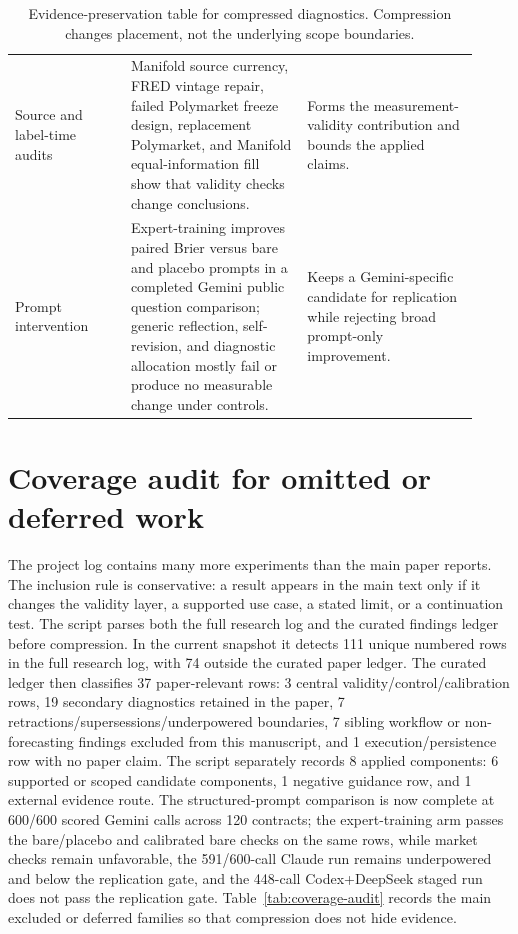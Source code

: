 \documentclass[11pt]{article}
\begin{document}
\begin{table}[htbp]
\begin{tabular}{L{0.23\linewidth} L{0.35\linewidth} L{0.34\linewidth}}
Source and label-time audits & Manifold source currency, FRED vintage repair, failed Polymarket freeze design, replacement Polymarket, and Manifold equal-information fill show that validity checks change conclusions. & Forms the measurement-validity contribution and bounds the applied claims. \\
Prompt intervention & Expert-training improves paired Brier versus bare and placebo prompts in a completed Gemini public question comparison; generic reflection, self-revision, and diagnostic allocation mostly fail or produce no measurable change under controls. & Keeps a Gemini-specific candidate for replication while rejecting broad prompt-only improvement. \\
\bottomrule
\end{tabular}
\caption{Evidence-preservation table for compressed diagnostics. Compression changes placement, not the underlying scope boundaries.}
\label{tab:evidence-ledger}
\end{table}

\section{Coverage audit for omitted or deferred work}
\label{app:coverage-audit}

The project log contains many more experiments than the main paper reports. The inclusion rule is conservative: a result appears in the main text only if it changes the validity layer, a supported use case, a stated limit, or a continuation test. The  script parses both the full research log and the curated findings ledger before compression. In the current snapshot it detects 111 unique numbered rows in the full research log, with 74 outside the curated paper ledger. The curated ledger then classifies 37 paper-relevant rows: 3 central validity/control/calibration rows, 19 secondary diagnostics retained in the paper, 7 retractions/supersessions/underpowered boundaries, 7 sibling workflow or non-forecasting findings excluded from this manuscript, and 1 execution/persistence row with no paper claim. The  script separately records 8 applied components: 6 supported or scoped candidate components, 1 negative guidance row, and 1 external evidence route. The structured-prompt comparison is now complete at 600/600 scored Gemini calls across 120 contracts; the expert-training arm passes the bare/placebo and calibrated bare checks on the same rows, while market checks remain unfavorable, the 591/600-call Claude run remains underpowered and below the replication gate, and the 448-call Codex+DeepSeek staged run does not pass the replication gate. Table~\ref{tab:coverage-audit} records the main excluded or deferred families so that compression does not hide evidence.
\end{document}
